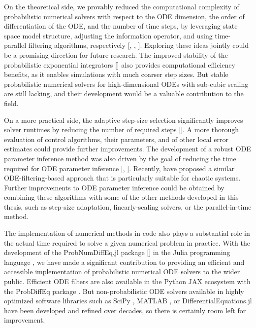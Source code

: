 \documentclass{mimosis}
\begin{document}
On the theoretical side, we provably reduced the computational complexity of probabilistic numerical solvers with respect to the ODE dimension, the order of differentiation of the ODE, and the number of time steps,
by leveraging state space model structure,
adjusting the information operator,
and using time-parallel filtering algorithms,
respectively
{[}\shighdim{}, \spickandmix{}, \spint{}].
Exploring these ideas jointly could be a promising direction for future research.
The improved stability of the probabilistic exponential integrators
{[}\sprobexpint{}]
also provides computational efficiency benefits, as it enables simulations with much coarser step sizes.
But stable probabilistic numerical solvers for high-dimensional ODEs with sub-cubic scaling are still lacking, and their development would be a valuable contribution to the field.

On a more practical side, the adaptive step-size selection significantly improves solver runtimes by reducing the number of required steps
{[}\scapos{}].
A more thorough evaluation of control algorithms, their parameters, and of other local error estimates could provide further improvements.
The development of a robust ODE parameter inference method was also driven by the goal of reducing the time required for ODE parameter inference
{[}\sfenrir{}, \stempering{}].
Recently, \textcite{dalton2024} have proposed a similar ODE-filtering-based approach that is particularly suitable for chaotic systems.
Further improvements to ODE parameter inference could be obtained by combining these algorithms with some of the other methods developed in this thesis, such as step-size adaptation, linearly-scaling solvers, or the parallel-in-time method.

The implementation of numerical methods in code also plays a substantial role in the actual time required to solve a given numerical problem in practice.
With the development of the ProbNumDiffEq.jl package [\sjoss{}] in the Julia programming language \parencite{bezanson2017julia}, we have made a significant contribution to providing an efficient and accessible implementation of probabilistic numerical ODE solvers to the wider public.
Efficient ODE filters are also available in the Python JAX ecosystem
\parencite{jax2018github}
with the ProbDiffEq package
\parencite{kramer2024implementing}.
But non-probabilistic ODE solvers available in
highly optimized software libraries such as SciPy \parencite{2020SciPy}, MATLAB \parencite{shampine1997matlab}, or DifferentialEquations.jl \parencite{rackauckas2017differentialequations}
have been developed and refined over decades, so there is certainly room left for improvement.
\end{document}
